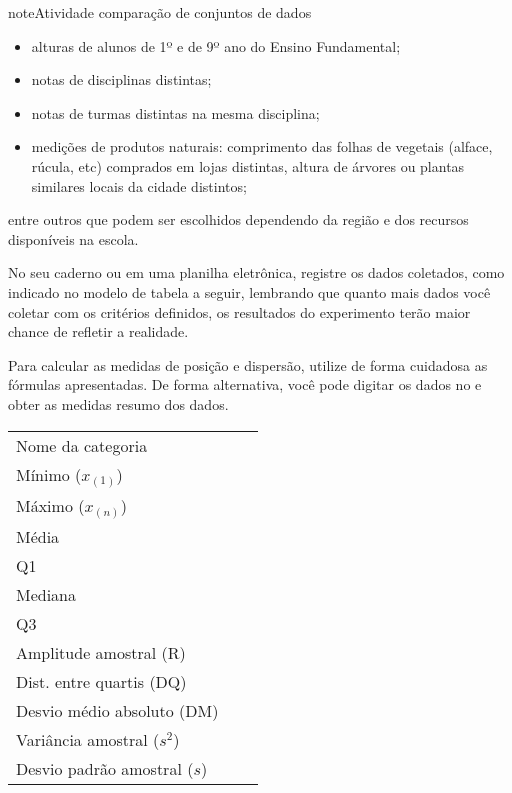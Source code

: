 \begin{sphinxadmonition}{note}{Atividade}{ comparação de conjuntos de dados}
\begin{itemize}
\item {} 
alturas de alunos de 1º e de 9º ano do Ensino Fundamental;

\item {} 
notas de disciplinas distintas;

\item {} 
notas de turmas distintas na mesma disciplina;

\item {} 
medições de produtos naturais: comprimento das folhas de vegetais (alface, rúcula, etc) comprados em lojas distintas, altura de árvores ou plantas similares locais da cidade distintos;

\end{itemize}

entre outros que podem ser escolhidos dependendo da região e dos recursos disponíveis na escola.

No seu caderno ou em uma planilha eletrônica, registre os dados coletados, como indicado no modelo de tabela a seguir, lembrando que quanto mais dados você coletar com os critérios definidos, os resultados do experimento terão maior chance de refletir a realidade.

Para calcular as medidas de posição e dispersão, utilize de forma cuidadosa as  fórmulas apresentadas. De forma alternativa, você pode digitar os dados no  e obter as medidas resumo dos dados.


\begin{savenotes}\sphinxattablestart
\centering
{}
\label{\detokenize{PE104-5:id1}}
\sphinxaftercaption
\begin{tabulary}{\linewidth}[t]{|T|T|T|}
\hline
\sphinxstylethead{\sphinxstyletheadfamily \unskip}\relax &\relax &\relax \\
\hline
Nome da categoria
&&\\
\hline
Mínimo (\(x_{(1)}\))
&&\\
\hline
Máximo  (\(x_{(n)}\))
&&\\
\hline
Média
&&\\
\hline
Q1
&&\\
\hline
Mediana
&&\\
\hline
Q3
&&\\
\hline
Amplitude amostral (R)
&&\\
\hline
Dist. entre quartis (DQ)
&&\\
\hline
Desvio médio absoluto (DM)
&&\\
\hline
Variância amostral (\(s^2\))
&&\\
\hline
Desvio padrão amostral (\(s\))
&&\\
\hline
\end{tabulary}
\par
\sphinxattableend\end{savenotes}


\end{sphinxadmonition}
